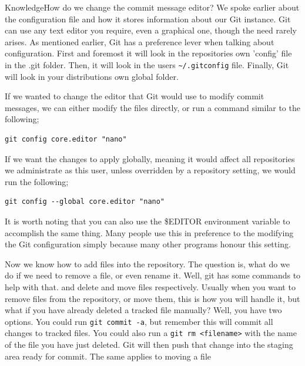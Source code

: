 \begin{callout}{Knowledge}{How do we change the commit message editor?}
We spoke earlier about the configuration file and how it stores information about our Git instance.
Git can use any text editor you require, even a graphical one, though the need rarely arises.
As mentioned earlier, Git has a preference lever when talking about configuration.
First and foremost it will look in the repositories own 'config' file in the .git folder.
Then, it will look in the users \texttt{\textasciitilde/.gitconfig} file.
Finally, Git will look in your distributions own global folder.

If we wanted to change the editor that Git would use to modify commit messages, we can either modify the files directly, or run a command similar to the following;

\begin{Verbatim}
git config core.editor "nano"
\end{Verbatim}

If we want the changes to apply globally, meaning it would affect all repositories we administrate as this user, unless overridden by a repository setting, we would run the following;

\begin{Verbatim}
git config --global core.editor "nano"
\end{Verbatim}

It is worth noting that you can also use the \$EDITOR environment variable to accomplish the same thing.
Many people use this in preference to the modifying the Git configuration simply because many other programs honour this setting.
\end{callout}

Now we know how to add files into the repository.
The question is, what do we do if we need to remove a file, or even rename it.
Well, git has some commands to help with that.
 and  delete and move files respectively.
Usually when you want to remove files from the repository, or move them, this is how you will handle it, but what if you have already deleted a tracked file manually? Well, you have two options.
You could run \texttt{git commit -a}, but remember this will commit all changes to tracked files.
You could also run a \texttt{git rm <filename>} with the name of the file you have just deleted.
Git will then push that change into the staging area ready for commit.
The same applies to moving a file

